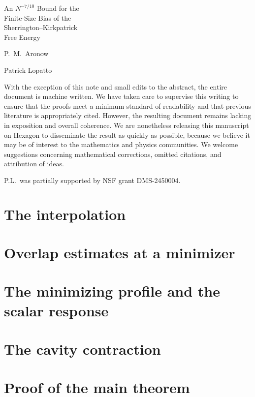 \documentclass[12pt,oneside,openany]{book}
\numberwithin{equation}{chapter}
\theoremstyle{plain}
\theoremstyle{definition}
\theoremstyle{remark}
\newcommand{\npptitlepage}[2]{%
  \hypersetup{pageanchor=false}%
  \begin{titlepage}
  \centering\normalfont
  \vspace*{1.7in}
  {\large\strut\par}
  \vspace{1.05in}
  {\fontsize{28}{35}\selectfont #1\par}
  \vspace{1.1in}
  {\Large\def\\{\par\vspace{10pt}}#2\par}
  \vfill
  \end{titlepage}%
  \hypersetup{pageanchor=true}}
\begin{document}
\frontmatter
\npptitlepage{An $N^{-7/10}$ Bound for the\\ Finite-Size Bias of the\\ Sherrington--Kirkpatrick\\ Free Energy}{P.\ M.\ Aronow\\ Patrick Lopatto}
\begin{authorsnote}
With the exception of this note and small edits to the abstract, the entire
document is machine written. We have taken care to supervise this writing to
ensure that the proofs meet a minimum standard of readability and that
previous literature is appropriately cited. However, the resulting document
remains lacking in exposition and overall coherence. We are nonetheless
releasing this manuscript on Hexagon to disseminate the result as quickly as
possible, because we believe it may be of interest to the mathematics and
physics communities. We welcome suggestions concerning mathematical
corrections, omitted citations, and attribution of ideas.

P.L.\ was partially supported by NSF grant DMS-2450004.
\end{authorsnote}
\begin{abstractpage}

\end{abstractpage}
\tableofcontents
\mainmatter




\part{The interpolation}\label{part:interpolation}



\part{Overlap estimates at a minimizer}\label{part:overlap}



\part{The minimizing profile and the scalar response}\label{part:profile}




\part{The cavity contraction}\label{part:cavity}




\part{Proof of the main theorem}\label{part:proof}


\backmatter

\setlength{\bibsep}{3pt plus 1pt minus 1pt}


\end{document}
